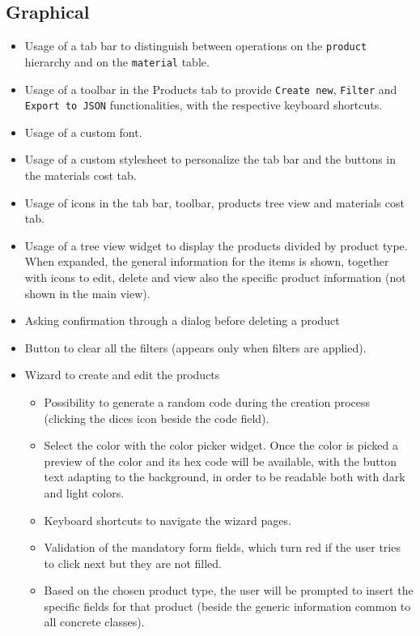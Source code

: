 \documentclass[10pt]{article}
\begin{document}
\subsection{Graphical}
\begin{itemize}
    \item Usage of a tab bar to distinguish between operations on the \texttt{product}
          hierarchy and on the \texttt{material} table.
    \item Usage of a toolbar in the Products tab to provide \texttt{Create new},
          \texttt{Filter} and \texttt{Export to JSON} functionalities, with the
          respective keyboard shortcuts.
    \item Usage of a custom font.
    \item Usage of a custom stylesheet to personalize the tab bar and the buttons in the
          materials cost tab.
    \item Usage of icons in the tab bar, toolbar, products tree view and materials cost
          tab.
    \item Usage of a tree view widget to display the products divided by product type.
          When expanded, the general information for the items is shown, together with
          icons to edit, delete and view also the specific product information (not shown
          in the main view).
    \item Asking confirmation through a dialog before deleting a product
    \item Button to clear all the filters (appears only when filters are applied).
    \item Wizard to create and edit the products
          \begin{itemize}
              \item Possibility to generate a random code during the creation process (clicking the
                    dices icon beside the code field).
              \item Select the color with the color picker widget. Once the color is picked a
                    preview of the color and its hex code will be available, with the button text
                    adapting to the background, in order to be readable both with dark and light
                    colors.
              \item Keyboard shortcuts to navigate the wizard pages.
              \item Validation of the mandatory form fields, which turn red if the user tries to
                    click next but they are not filled.
              \item Based on the chosen product type, the user will be prompted to insert the
                    specific fields for that product (beside the generic information common to all
                    concrete classes).
          \end{itemize}

\end{itemize}
\newpage
\end{document}
